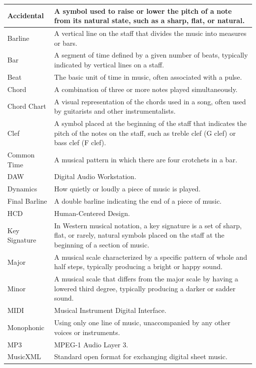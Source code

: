 \documentclass[12pt]{article}
\begin{document}
\begin{longtable}{|l|p{12cm}|}
Accidental & A symbol used to raise or lower the pitch of a note from its natural state, such as a sharp, flat, or natural. \\ 
\hline
Barline & A vertical line on the staff that divides the music into measures or bars. \\ 
\hline
Bar & A segment of time defined by a given number of beats, typically indicated by vertical lines on a staff. \\ 
\hline
Beat & The basic unit of time in music, often associated with a pulse. \\ 
\hline
Chord & A combination of three or more notes played simultaneously. \\ 
\hline
Chord Chart & A visual representation of the chords used in a song, often used by guitarists and other instrumentalists. \\ 
\hline
Clef & A symbol placed at the beginning of the staff that indicates the pitch of the notes on the staff, such as treble clef (G clef) or bass clef (F clef). \\ 
\hline
Common Time & A musical pattern in which there are four crotchets in a bar. \\ 
\hline
DAW & Digital Audio Workstation. \\ 
\hline
Dynamics & How quietly or loudly a piece of music is played. \\ 
\hline
Final Barline & A double barline indicating the end of a piece of music. \\ 
\hline
HCD & Human-Centered Design. \\ 
\hline
Key Signature & In Western musical notation, a key signature is a set of sharp, flat, or rarely, natural symbols placed on the staff at the beginning of a section of music. \\ 
\hline
Major & A musical scale characterized by a specific pattern of whole and half steps, typically producing a bright or happy sound. \\ 
\hline
Minor & A musical scale that differs from the major scale by having a lowered third degree, typically producing a darker or sadder sound. \\ 
\hline
MIDI & Musical Instrument Digital Interface. \\ 
\hline
Monophonic & Using only one line of music, unaccompanied by any other voices or instruments. \\ 
\hline
MP3 & MPEG-1 Audio Layer 3. \\ 
\hline
MusicXML & Standard open format for exchanging digital sheet music. \\ 

\end{longtable}
\end{document}
